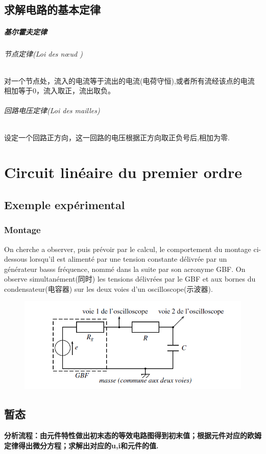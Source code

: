 \documentclass[12pt]{book}
\theoremstyle{definition}\newtheorem{dfn}{Définition}[chapter]
\theoremstyle{plain}\newtheorem{thm}{Théorème}[chapter]
\theoremstyle{plain}\newtheorem{prp}{Proposition}[chapter]
\theoremstyle{plain}\newtheorem{lem}{\bf Lemme}[chapter]
\theoremstyle{plain}\newtheorem{axm}{\bf Axiome}[chapter]
\theoremstyle{plain}\newtheorem{lmm}{\bf Lemme}[chapter]
\theoremstyle{plain}\newtheorem{cor}{\bf Corollaire}[chapter]
\theoremstyle{remark}\newtheorem{rem}{Remarque}[chapter]
\begin{document}
\section{求解电路的基本定律}
\paragraph{基尔霍夫定律}
\subparagraph{节点定律(Loi des nœud )}对一个节点处，流入的电流等于流出的电流(电荷守恒),或者所有流经该点的电流相加等于0，流入取正，流出取负。
\subparagraph{回路电压定律(Loi des mailles)}设定一个回路正方向，这一回路的电压根据正方向取正负号后,相加为零.

\chapter{Circuit linéaire du premier ordre}
\section{Exemple expérimental}
\subsection{Montage}
On cherche a observer, puis prévoir par le  calcul, le comportement du montage ci-dessous
lorsqu'il est alimenté par une tension constante délivrée par un générateur basss fréquence, nommé dans la suite par son acronyme GBF. On observe simultanément(同时) les tensions délivrées par le GBF et aux bornes du condensateur(电容器) sur les deux voies d'un oscilloscope(示波器).
\begin{figure}[H]
	\centering
	\includegraphics[scale=0.7]{image//Circuit lineaire du premier ordre//1}
\end{figure}

\section{暂态}
\textbf{分析流程：由元件特性做出初末态的等效电路图得到初末值；根据元件对应的欧姆定律得出微分方程；求解出对应的u,i和元件的值.}
\end{document}

